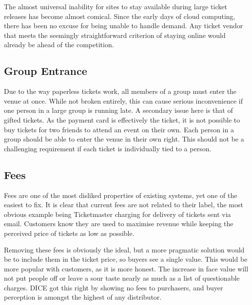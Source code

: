\documentclass[12pt]{bhamdissertation}
\begin{document}
The almost universal inability for sites to stay available during large ticket releases has become almost comical. Since the early days of cloud computing, there has been no excuse for being unable to handle demand. Any ticket vendor that meets the seemingly straightforward criterion of staying online would already be ahead of the competition.

\subsection{Group Entrance}

Due to the way paperless tickets work, all members of a group must enter the venue at once. While not broken entirely, this can cause serious inconvenience if one person in a large group is running late. A secondary issue here is that of gifted tickets. As the payment card is effectively the ticket, it is not possible to buy tickets for two friends to attend an event on their own. Each person in a group should be able to enter the venue in their own right. This should not be a challenging requirement if each ticket is individually tied to a person.

\subsection{Fees}

Fees are one of the most disliked properties of existing systems, yet one of the easiest to fix. It is clear that current fees are not related to their label, the most obvious example being Ticketmaster charging for delivery of tickets sent via email. Customers know they are used to maximise revenue while keeping the perceived price of tickets as low as possible.

Removing these fees is obviously the ideal, but a more pragmatic solution would be to include them in the ticket price, so buyers see a single value. This would be more popular with customers, as it is more honest. The increase in face value will not put people off or leave a sour taste nearly as much as a list of questionable charges. DICE got this right by showing no fees to purchasers, and buyer perception is amongst the highest of any distributor.
\end{document}
